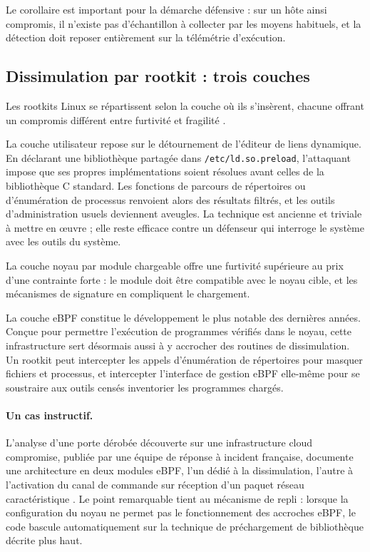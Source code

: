 Le corollaire est important pour la démarche défensive : sur un hôte ainsi compromis, il n'existe pas d'échantillon à collecter par les moyens habituels, et la détection doit reposer entièrement sur la télémétrie d'exécution.

\subsection{Dissimulation par rootkit : trois couches}

Les rootkits Linux se répartissent selon la couche où ils s'insèrent, chacune offrant un compromis différent entre furtivité et fragilité \cite{elasticRootkits}.

La couche utilisateur repose sur le détournement de l'éditeur de liens dynamique. En déclarant une bibliothèque partagée dans \texttt{/etc/ld.so.preload}, l'attaquant impose que ses propres implémentations soient résolues avant celles de la bibliothèque C standard. Les fonctions de parcours de répertoires ou d'énumération de processus renvoient alors des résultats filtrés, et les outils d'administration usuels deviennent aveugles. La technique est ancienne et triviale à mettre en \oe uvre ; elle reste efficace contre un défenseur qui interroge le système avec les outils du système.

La couche noyau par module chargeable offre une furtivité supérieure au prix d'une contrainte forte : le module doit être compatible avec le noyau cible, et les mécanismes de signature en compliquent le chargement.

La couche eBPF constitue le développement le plus notable des dernières années. Conçue pour permettre l'exécution de programmes vérifiés dans le noyau, cette infrastructure sert désormais aussi à y accrocher des routines de dissimulation. Un rootkit peut intercepter les appels d'énumération de répertoires pour masquer fichiers et processus, et intercepter l'interface de gestion eBPF elle-même pour se soustraire aux outils censés inventorier les programmes chargés.

\paragraph{Un cas instructif.} L'analyse d'une porte dérobée découverte sur une infrastructure cloud compromise, publiée par une équipe de réponse à incident française, documente une architecture en deux modules eBPF, l'un dédié à la dissimulation, l'autre à l'activation du canal de commande sur réception d'un paquet réseau caractéristique \cite{synacktiv2025}. Le point remarquable tient au mécanisme de repli : lorsque la configuration du noyau ne permet pas le fonctionnement des accroches eBPF, le code bascule automatiquement sur la technique de préchargement de bibliothèque décrite plus haut.

